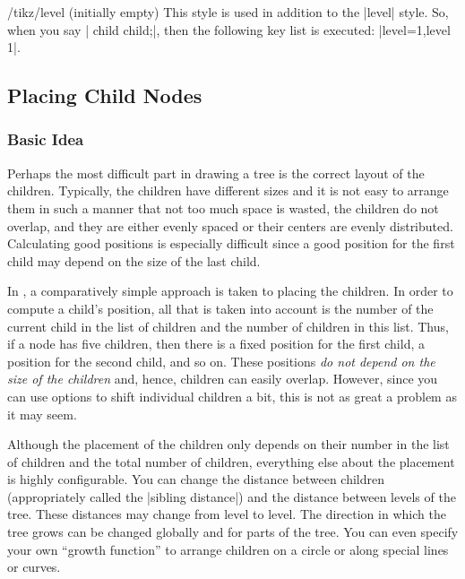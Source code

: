 \begin{stylekey}{/tikz/level  (initially \normalfont empty)}
  This style is used in addition to the |level| style. So, when you
  say | child child;|, then the following key list is
  executed: |level=1,level 1|.

\begin{codeexample}[]
\end{codeexample}
\end{stylekey}



\subsection{Placing Child Nodes}

\label{section-tree-placement}

\subsubsection{Basic Idea}

Perhaps the most difficult part in drawing a tree is the correct
layout of the children. Typically, the children have different sizes
and it is not easy to arrange them in such a manner that not too much
space is wasted, the children do not overlap, and they are either
evenly spaced or their centers are evenly distributed. Calculating
good positions is especially difficult since a good position for the
first child may depend on the size of the last child.

In \tikzname, a comparatively simple approach is taken to placing the
children. In order to compute a child's position, all that is taken
into account is the number of the current child in the list of
children and the number of children in this list. Thus, if a node has
five children, then there is a fixed position for the first child, a
position for the second child, and so on. These positions \emph{do not
  depend on the size of the children} and, hence, children can easily
overlap. However, since you can use options to shift individual
children a bit, this is not as great a problem as it may seem.

Although the placement of the children only depends on their number in
the list of children and the total number of children, everything else
about the placement is highly configurable. You can change the
distance between children (appropriately called the
|sibling distance|) and the distance between levels of the tree. These
distances may change from level to level. The direction in which the
tree grows can be changed globally and for parts of the tree. You can
even specify your own ``growth function'' to arrange children on a
circle or along special lines or curves.

